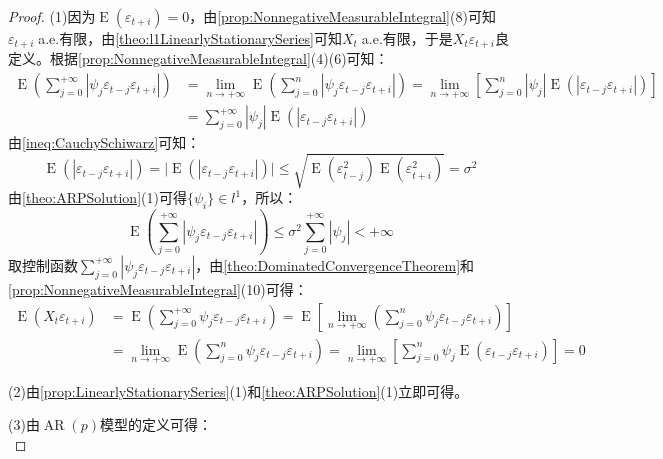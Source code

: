 \begin{proof}
	(1)因为$\operatorname{E}(\varepsilon_{t+i})=0$，由\cref{prop:NonnegativeMeasurableIntegral}(8)可知$\varepsilon_{t+i}\;$a.e.有限，由\cref{theo:l1LinearlyStationarySeries}可知$X_t\;$a.e.有限，于是$X_t\varepsilon_{t+i}$良定义。根据\cref{prop:NonnegativeMeasurableIntegral}(4)(6)可知：
	\begin{align*}
		\operatorname{E}\left(\sum_{j=0}^{+\infty}|\psi_j\varepsilon_{t-j}\varepsilon_{t+i}|\right)
		&=\lim_{n\to+\infty}\operatorname{E}\left(\sum_{j=0}^{n}|\psi_j\varepsilon_{t-j}\varepsilon_{t+i}|\right)
		=\lim_{n\to+\infty}\left[\sum_{j=0}^{n}|\psi_j|\operatorname{E}(|\varepsilon_{t-j}\varepsilon_{t+i}|)\right] \\
		&=\sum_{j=0}^{+\infty}|\psi_j|\operatorname{E}(|\varepsilon_{t-j}\varepsilon_{t+i}|)
	\end{align*}
	由\cref{ineq:CauchySchiwarz}可知：
	\begin{equation*}
		\operatorname{E}(|\varepsilon_{t-j}\varepsilon_{t+i}|)=\Big|\operatorname{E}(|\varepsilon_{t-j}\varepsilon_{t+i}|)\Big|\leqslant\sqrt{\operatorname{E}(\varepsilon_{t-j}^2)\operatorname{E}(\varepsilon_{t+i}^2)}=\sigma^2
	\end{equation*}
	由\cref{theo:ARPSolution}(1)可得$\{\psi_i\}\in l^1$，所以：
	\begin{equation*}
		\operatorname{E}\left(\sum_{j=0}^{+\infty}|\psi_j\varepsilon_{t-j}\varepsilon_{t+i}|\right)\leqslant\sigma^2\sum_{j=0}^{+\infty}|\psi_j|<+\infty
	\end{equation*}
	取控制函数$\sum\limits_{j=0}^{+\infty}|\psi_j\varepsilon_{t-j}\varepsilon_{t+i}|$，由\cref{theo:DominatedConvergenceTheorem}和\cref{prop:NonnegativeMeasurableIntegral}(10)可得：
	\begin{align*}
		\operatorname{E}(X_t\varepsilon_{t+i})&=\operatorname{E}\left(\sum_{j=0}^{+\infty}\psi_j\varepsilon_{t-j}\varepsilon_{t+i}\right)=\operatorname{E}\left[\lim_{n\to+\infty}\left(\sum_{j=0}^{n}\psi_j\varepsilon_{t-j}\varepsilon_{t+i}\right)\right] \\
		&=\lim_{n\to+\infty}\operatorname{E}\left(\sum_{j=0}^{n}\psi_j\varepsilon_{t-j}\varepsilon_{t+i}\right)=\lim_{n\to+\infty}\left[\sum_{j=0}^{n}\psi_j\operatorname{E}(\varepsilon_{t-j}\varepsilon_{t+i})\right]=0
	\end{align*}\par
	(2)由\cref{prop:LinearlyStationarySeries}(1)和\cref{theo:ARPSolution}(1)立即可得。\par
	(3)由$\operatorname{AR}(p)$模型的定义可得：
	\begin{equation*}

\end{equation*}
\end{proof}
